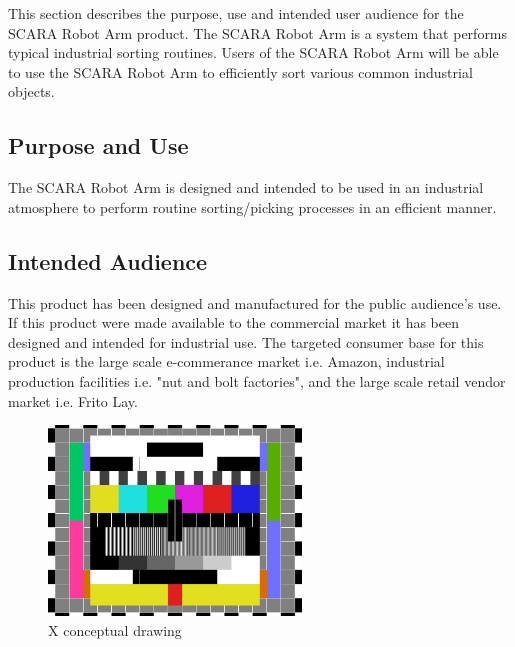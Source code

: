  This section describes the purpose, use and intended user audience for the SCARA Robot Arm product. The SCARA Robot Arm is a system that performs typical industrial sorting routines. Users of the SCARA Robot Arm will be able to use the SCARA Robot Arm to efficiently sort various common industrial objects.

\subsection{Purpose and Use}
The SCARA Robot Arm is designed and intended to be used in an industrial atmosphere to perform routine sorting/picking processes in an efficient manner.

\subsection{Intended Audience}
This product has been designed and manufactured for the public audience's use. If this product were made available to the commercial market it has been designed and intended for industrial use. The targeted consumer base for this product is the large scale e-commerance market i.e. Amazon, industrial production facilities i.e. "nut and bolt factories", and the large scale retail vendor market i.e. Frito Lay. 

\begin{figure}[h!]
	\centering
   	\includegraphics[width=0.60\textwidth]{images/test_image}
    \caption{X conceptual drawing}
\end{figure}
